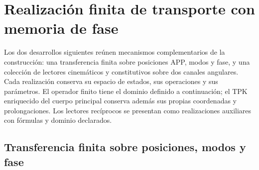 \section{Realización finita de transporte con memoria de fase}
\label{iii:hist:antecedentes}

Los dos desarrollos siguientes reúnen mecanismos complementarios de la
construcción: una transferencia finita sobre posiciones APP, modos y fase,
y una colección de lectores cinemáticos y constitutivos sobre dos canales
angulares. Cada realización conserva su espacio de estados, sus operaciones
y sus parámetros. El operador finito tiene el dominio definido a
continuación; el TPK enriquecido del cuerpo principal conserva además sus
propias coordenadas y prolongaciones. Los lectores recíprocos se presentan
como realizaciones auxiliares con fórmulas y dominio declarados.

\subsection{Transferencia finita sobre posiciones, modos y fase}
\label{iii:hist:transferencia}

